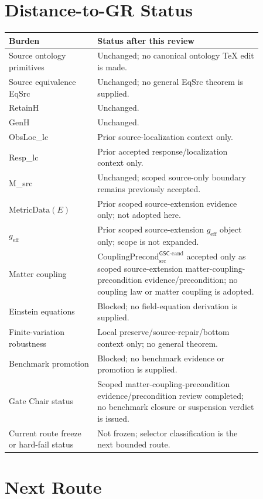 \documentclass[11pt]{article}
\newcommand{\geff}{g_{\mathrm{eff}}}
\newcommand{\CouplingPrecond}{\mathrm{CouplingPrecond}^{\mathsf{GSC}\mbox{-}\mathrm{cand}}_{\mathrm{src}}}
\newcommand{\MetricData}{\mathrm{MetricData}}
\begin{document}
\section{Distance-to-GR Status}

\begin{longtable}{p{0.30\linewidth}p{0.56\linewidth}}
\toprule
Burden & Status after this review \\
\midrule
Source ontology primitives & Unchanged; no canonical ontology TeX edit is made. \\
Source equivalence EqSrc & Unchanged; no general EqSrc theorem is supplied. \\
RetainH & Unchanged. \\
GenH & Unchanged. \\
ObsLoc\_lc & Prior source-localization context only. \\
Resp\_lc & Prior accepted response/localization context only. \\
M\_src & Unchanged; scoped source-only boundary remains previously accepted. \\
\(\MetricData(E)\) & Prior scoped source-extension evidence only; not adopted here. \\
\(\geff\) & Prior scoped source-extension \(\geff\) object only; scope is not expanded. \\
Matter coupling & \(\CouplingPrecond\) accepted only as scoped source-extension matter-coupling-precondition evidence/precondition; no coupling law or matter coupling is adopted. \\
Einstein equations & Blocked; no field-equation derivation is supplied. \\
Finite-variation robustness & Local preserve/source-repair/bottom context only; no general theorem. \\
Benchmark promotion & Blocked; no benchmark evidence or promotion is supplied. \\
Gate Chair status & Scoped matter-coupling-precondition evidence/precondition review completed; no benchmark closure or suspension verdict is issued. \\
Current route freeze or hard-fail status & Not frozen; selector classification is the next bounded route. \\
\bottomrule
\end{longtable}

\section{Next Route}
\end{document}
